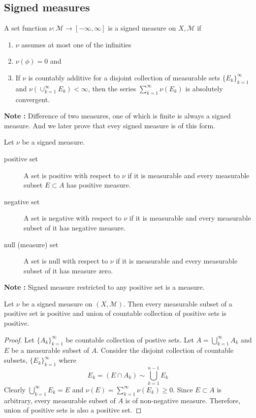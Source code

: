 \subsection{Signed measures}
\begin{definition}
	A set function $\nu : \mathcal{M} \to [-\infty,\infty]$ is a signed measure on $X,\mathcal{M}$ if
	\begin{enumerate}
		\item $\nu$ assumes at most one of the infinities
		\item $\nu(\phi) = 0$ and
		\item If $\nu$ is countably additive for a disjoint collection of measurable sets $\{ E_k \}_{k=1}^\infty$ and $\nu(\cup_{k=1}^\infty E_k) < \infty$, then the series $\sum_{k=1}^\infty \nu(E_k)$ is absolutely convergent.
	\end{enumerate}
\end{definition}
\textbf{Note : } Difference of two measures, one of which is finite is always a signed measure. And we later prove that evey signed measure is of this form.

\begin{definition}
	Let $\nu$ be a signed measure.
\begin{description}
	\item[positive set] A set is positive with respect to $\nu$ if it is measurable and every measurable subset $E \subset A$ has positive measure.
	\item[negative set] A set is negative with respect to $\nu$ if it is measurable and every measurable subset of it has negative measure.
	\item[null (measure) set] A set is null with respect to $\nu$ if it is measurable and every measurable subset of it has measure zero.
\end{description}
\end{definition}

\textbf{Note : } Signed measure restricted to any positive set is a measure.

\begin{theorem}
	Let $\nu$ be a signed measure on $(X,\mathcal{M})$.
	Then every measurable subset of a positive set is positive and union of countable collection of positive sets is positive.
\end{theorem}
\begin{proof}
	Let $\{ A_k \}_{k=1}^\infty$ be countable collection of postive sets.
	Let $\displaystyle A = \bigcup_{k=1}^\infty A_k$ and $E$ be a measurable subset of $A$.
	Consider the disjoint collection of countable subsets, $\{ E_k \}_{k=1}^\infty$ where
	$$E_k = (E \cap A_k) \sim \bigcup_{k=1}^{n-1}E_k$$
	Clearly $\displaystyle \bigcup_{k=1}^\infty E_k = E$ and $\displaystyle \nu(E) = \sum_{k=1}^\infty \nu(E_k) \ge 0$.
	Since $E \subset A$ is arbitrary, every measurable subset of $A$ is of non-negative measure.
	Therefore, union of positive sets is also a positive set.
\end{proof}

